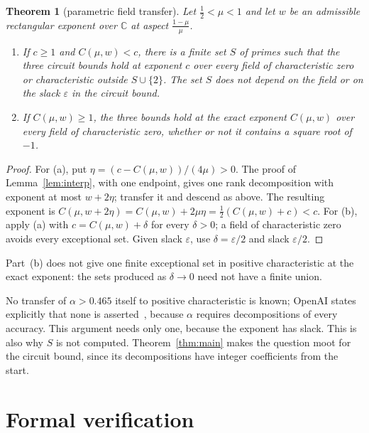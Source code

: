 \documentclass[11pt]{article}
\newtheorem{theorem}{Theorem}[section]
\theoremstyle{definition}
\theoremstyle{remark}
\newcommand{\C}{\mathbb{C}}
\begin{document}
\begin{theorem}[parametric field transfer]\label{thm:fieldtransfer}
Let $\frac12<\mu<1$ and let $w$ be an admissible rectangular exponent over $\C$ at aspect $\frac{1-\mu}{\mu}$.
\begin{enumerate}[label=(\alph*)]
\item If $c\ge1$ and $C(\mu,w)<c$, there is a finite set $S$ of primes such that the three circuit bounds hold at
exponent $c$ over every field of characteristic zero or characteristic outside $S\cup\{2\}$. The set $S$ does not
depend on the field or on the slack $\varepsilon$ in the circuit bound.
\item If $C(\mu,w)\ge1$, the three bounds hold at the exact exponent $C(\mu,w)$ over every field of characteristic
zero, whether or not it contains a square root of $-1$.
\end{enumerate}
\end{theorem}
\begin{proof}
For (a), put $\eta=(c-C(\mu,w))/(4\mu)>0$. The proof of Lemma~\ref{lem:interp}, with one endpoint, gives one rank
decomposition with exponent at most $w+2\eta$; transfer it and descend as above. The resulting exponent is
$C(\mu,w+2\eta)=C(\mu,w)+2\mu\eta=\frac12(C(\mu,w)+c)<c$. For (b), apply (a) with $c=C(\mu,w)+\delta$ for every
$\delta>0$; a field of characteristic zero avoids every exceptional set. Given slack $\varepsilon$, use
$\delta=\varepsilon/2$ and slack $\varepsilon/2$.
\end{proof}
Part~(b) does not give one finite exceptional set in positive characteristic at the exact exponent: the sets
produced as $\delta\to0$ need not have a finite union.

No transfer of $\alpha>0.465$ itself to positive characteristic is known; OpenAI states explicitly that none is
asserted~\cite[\S14]{OAI2026b}, because $\alpha$ requires decompositions of every accuracy. This argument needs only
one, because the exponent has slack. This is also why $S$ is not computed. Theorem~\ref{thm:main} makes the
question moot for the circuit bound, since its decompositions have integer coefficients from the start.

\section{Formal verification}\label{sec:lean}
\end{document}
